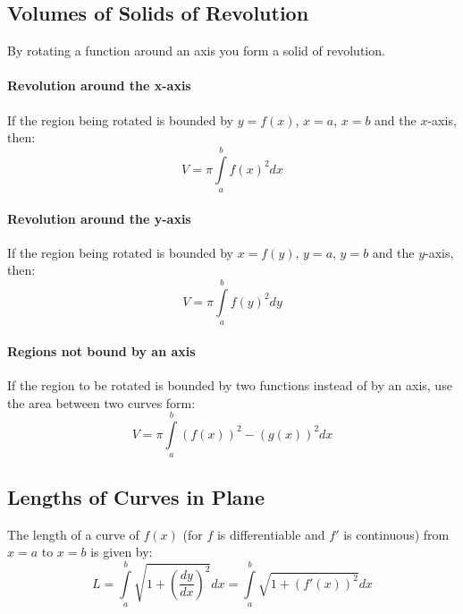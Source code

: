 \documentclass[a4paper,twoside,10pt]{article}
\begin{document}
		\subsection{Volumes of Solids of Revolution}
			By rotating a function around an axis you form a solid of revolution.
			\paragraph{Revolution around the x-axis} If the region being rotated is bounded by $y=f(x)$, $x=a$, $x=b$ and the $x$-axis, then:
			\[
				V=\pi\int\limits_a^bf(x)^2dx
			\]
			\paragraph{Revolution around the y-axis} If the region being rotated is bounded by $x=f(y)$, $y=a$, $y=b$ and the $y$-axis, then:
			\[
				V=\pi\int\limits_a^bf(y)^2dy
			\]
			\paragraph{Regions not bound by an axis} If the region to be rotated is bounded by two functions instead of by an axis, use the area between two curves form:
			\[
				V=\pi\int\limits_a^b(f(x))^2-(g(x))^2dx
			\]
		\subsection{Lengths of Curves in Plane}
			The length of a curve of $f(x)$ (for $f$ is differentiable and $f'$ is continuous) from $x=a$ to $x=b$ is given by:
			\[
				L=\int\limits_a^b\sqrt{1+\left(\frac{dy}{dx}\right)^2}dx=\int\limits_a^b\sqrt{1+\left(f'(x)\right)^2}dx
			\]
			
\end{document}
